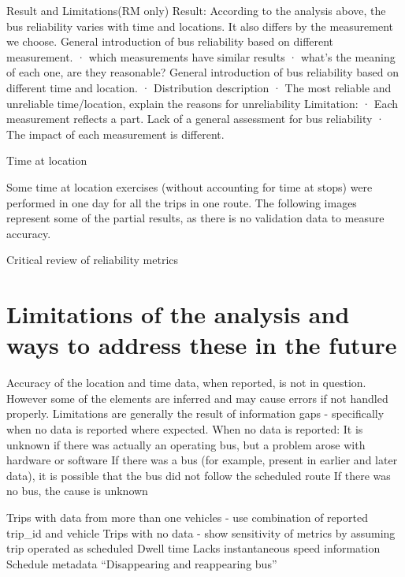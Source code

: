 \documentclass[12pt,journal,compsoc]{IEEEtran}
\begin{document}
 
Result and Limitations(RM only)
Result:
According to the analysis above, the bus reliability varies with time and locations. It also differs by the measurement we choose.
General introduction of bus reliability based on different measurement.
·      which measurements have similar results
·      what’s the meaning of each one, are they reasonable?
General introduction of bus reliability based on different time and location.
·      Distribution description
·      The most reliable and unreliable time/location, explain the reasons for unreliability
Limitation:
·      Each measurement reflects a part. Lack of a general assessment for bus reliability
·      The impact of each measurement is different.


Time at location

Some time at location exercises (without accounting for time at stops) were performed in one day for all the trips in one route. The following images represent some of the partial results, as there is no validation data to measure accuracy.







Critical review of reliability metrics



\section{Limitations of the analysis and ways to address these in the future}
Accuracy of the location and time data, when reported, is not in question. However some of the elements are inferred and may cause errors if not handled properly.
Limitations are generally the result of information gaps - specifically when no data is reported where expected.
When no data is reported:
It is unknown if there was actually an operating bus, but a problem arose with hardware or software
If there was a bus (for example, present in earlier and later data), it is possible that the bus did not follow the scheduled route
If there was no bus, the cause is unknown

Trips with data from more than one vehicles - use combination of reported trip\_id and vehicle
Trips with no data - show sensitivity of metrics by assuming trip operated as scheduled
Dwell time
Lacks instantaneous speed information
Schedule metadata
“Disappearing and reappearing bus” 
\end{document}
